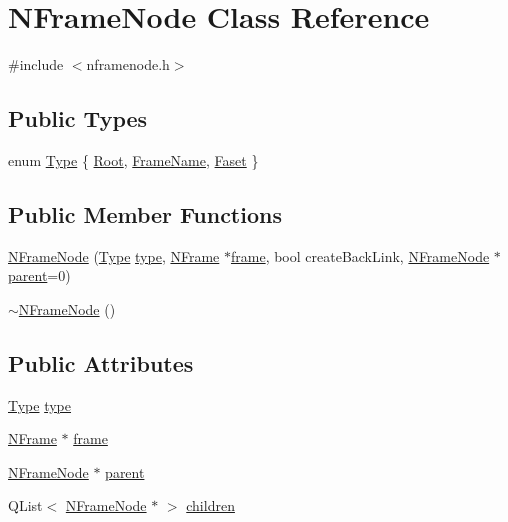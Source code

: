 \hypertarget{class_n_frame_node}{
\section{NFrameNode Class Reference}
\label{class_n_frame_node}
}


{\ttfamily \#include $<$nframenode.h$>$}

\subsection*{Public Types}
\begin{DoxyCompactItemize}
\item 
enum \hyperlink{class_n_frame_node_ac3b53c68976e21afcab76ad3a184781a}{Type} \{ \hyperlink{class_n_frame_node_ac3b53c68976e21afcab76ad3a184781aa1019f0f297f77d78c193e632aa95d0f8}{Root}, 
\hyperlink{class_n_frame_node_ac3b53c68976e21afcab76ad3a184781aa5f1fc4b0084d4511738d3d6a5fe3008d}{FrameName}, 
\hyperlink{class_n_frame_node_ac3b53c68976e21afcab76ad3a184781aa5a25791026e2e1cf2565a2e30cd10050}{Faset}
 \}
\end{DoxyCompactItemize}
\subsection*{Public Member Functions}
\begin{DoxyCompactItemize}
\item 
\hyperlink{class_n_frame_node_a0e18994980324ff3712cc8dc5b951248}{NFrameNode} (\hyperlink{class_n_frame_node_ac3b53c68976e21afcab76ad3a184781a}{Type} \hyperlink{class_n_frame_node_a505e19a5298af41dcd622344bd3875e8}{type}, \hyperlink{class_n_frame}{NFrame} $\ast$\hyperlink{class_n_frame_node_a8f3e3eaa1c2ae6cb7be00ea2444fd098}{frame}, bool createBackLink, \hyperlink{class_n_frame_node}{NFrameNode} $\ast$\hyperlink{class_n_frame_node_ab2675b008092b16312265051255ac6d8}{parent}=0)
\item 
\hyperlink{class_n_frame_node_a479bcf563feda3122d7323ca424eec0f}{$\sim$NFrameNode} ()
\end{DoxyCompactItemize}
\subsection*{Public Attributes}
\begin{DoxyCompactItemize}
\item 
\hyperlink{class_n_frame_node_ac3b53c68976e21afcab76ad3a184781a}{Type} \hyperlink{class_n_frame_node_a505e19a5298af41dcd622344bd3875e8}{type}
\item 
\hyperlink{class_n_frame}{NFrame} $\ast$ \hyperlink{class_n_frame_node_a8f3e3eaa1c2ae6cb7be00ea2444fd098}{frame}
\item 
\hyperlink{class_n_frame_node}{NFrameNode} $\ast$ \hyperlink{class_n_frame_node_ab2675b008092b16312265051255ac6d8}{parent}
\item 
QList$<$ \hyperlink{class_n_frame_node}{NFrameNode} $\ast$ $>$ \hyperlink{class_n_frame_node_a999f2dc424e2a11c2818a95df03a26c5}{children}
\end{DoxyCompactItemize}


